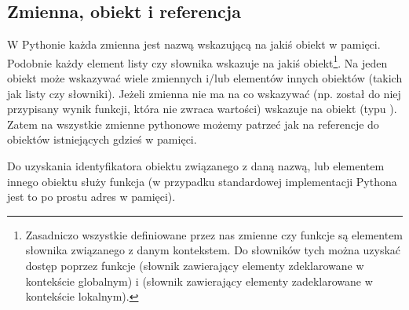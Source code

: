% 
% 
% 
% 

\subsection{Zmienna, obiekt i referencja }

W Pythonie każda zmienna jest nazwą wskazującą na jakiś obiekt w pamięci. Podobnie każdy element listy czy słownika wskazuje na jakiś obiekt\footnote{
Zasadniczo wszystkie definiowane przez nas zmienne czy funkcje są elementem słownika związanego z danym kontekstem.
Do słowników tych można uzyskać dostęp poprzez funkcje  (słownik zawierający elementy zdeklarowane w kontekście globalnym) i
 (słownik zawierający elementy zadeklarowane w kontekście lokalnym).
}.
Na jeden obiekt może wskazywać wiele zmiennych i/lub elementów innych obiektów (takich jak listy czy słowniki).
Jeżeli zmienna nie ma na co wskazywać (np. został do niej przypisany wynik funkcji, która nie zwraca wartości) wskazuje na obiekt  (typu ).
Zatem na wszystkie zmienne pythonowe możemy patrzeć jak na referencje do obiektów istniejących gdzieś w pamięci.

Do uzyskania identyfikatora obiektu związanego z daną nazwą, lub elementem innego obiektu służy funkcja  (w przypadku standardowej implementacji Pythona jest to po prostu adres w pamięci).

